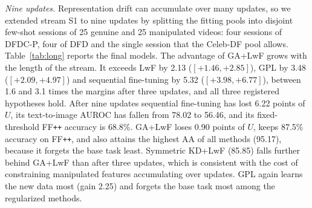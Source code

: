 \documentclass[journal]{IEEEtran}
\newcommand{\ffpp}{FF\texttt{++}}
\begin{document}
\begin{table}[t]
\caption{Comparison at matched plasticity on stream S1 (five seeds; test splits with 8 frames per video). Matched settings were chosen on development data as those whose development gain is closest to that of GA+LwF; the other rows are the default settings for reference.}
\label{tab:matched}
\centering
\footnotesize
\setlength{\tabcolsep}{1.7pt}
\end{table}

\textit{Nine updates.}\label{sec:long} Representation drift can accumulate over many updates, so we extended stream S1 to nine updates by splitting the fitting pools into disjoint few-shot sessions of 25 genuine and 25 manipulated videos: four sessions of DFDC-P, four of DFD and the single session that the Celeb-DF pool allows. Table~\ref{tab:long} reports the final models. The advantage of GA+LwF grows with the length of the stream. It exceeds LwF by 2.13 ($[+1.46,+2.85]$), GPL by 3.48 ($[+2.09,+4.97]$) and sequential fine-tuning by 5.32 ($[+3.98,+6.77]$), between 1.6 and 3.1 times the margins after three updates, and all three registered hypotheses hold. After nine updates sequential fine-tuning has lost 6.22 points of $U$, its text-to-image AUROC has fallen from 78.02 to 56.46, and its fixed-threshold \ffpp{} accuracy is 68.8\%. GA+LwF loses 0.90 points of $U$, keeps 87.5\% accuracy on \ffpp{}, and also attains the highest AA of all methods (95.17), because it forgets the base task least. Symmetric KD+LwF (85.85) falls further behind GA+LwF than after three updates, which is consistent with the cost of constraining manipulated features accumulating over updates. GPL again learns the new data most (gain 2.25) and forgets the base task most among the regularized methods.
\end{document}
